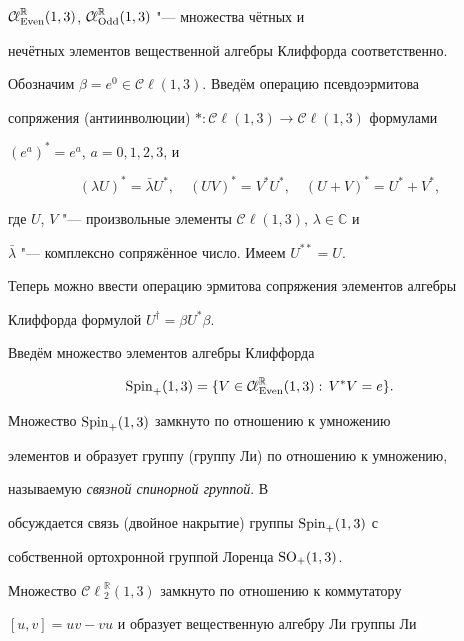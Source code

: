 ${\mathcal{C\!\ell}}_{\rm Even}^{\mathbb R}(1, 3)$,  ${\mathcal{C\!\ell}}_{\rm Odd}^{\mathbb R}(1, 3)$ "--- множества чётных и

нечётных элементов вещественной алгебры Клиффорда соответственно.



Обозначим $\beta=e^0\in{\mathcal{C\!\ell}}(1, 3)$. Введём операцию псевдоэрмитова

сопряжения (антиинволюции) $* : {\mathcal{C\!\ell}}(1, 3) \to {\mathcal{C\!\ell}}(1, 3)$ формулами

$(e^a)^*=e^a$,  $a=0, 1, 2, 3$,  и

$$

(\lambda U)^*=\bar\lambda U^*, \quad (UV)^*=V^*U^*, \quad

(U+V)^*=U^*+V^*, 

$$

где $U$,  $V$ "--- произвольные элементы ${\mathcal{C\!\ell}}(1, 3)$,  $\lambda\in{\mathbb C}$ и

$\bar\lambda$ "--- комплексно сопряжённое число. Имеем $U^{**}=U$.



Теперь можно ввести операцию эрмитова сопряжения элементов алгебры

Клиффорда формулой \cite{marchuk11:3} $ U^\dagger=\beta

U^*\beta$.



Введём множество элементов алгебры Клиффорда \cite{marchuk11:2}

$$

{\rm Spin}_+(1, 3) = \{V\in{\mathcal{C\!\ell}}^{\mathbb R}_{\rm Even}(1, 3):\,V^*V=e\}.

$$

Множество ${\rm Spin}_+(1, 3)$ замкнуто по отношению к умножению

элементов и образует группу (группу Ли) по отношению к умножению, 

называемую {\em связной спинорной группой}. В \cite{marchuk11:2}

обсуждается связь (двойное накрытие) группы ${\rm Spin}_+(1, 3)$ с

собственной ортохронной группой Лоренца ${\rm SO}_+(1, 3)$.



Множество ${\mathcal{C\!\ell}}^{\mathbb R}_2(1, 3)$ замкнуто по отношению к коммутатору

$[u, v]=u v-v u$ и образует вещественную алгебру Ли группы  Ли

